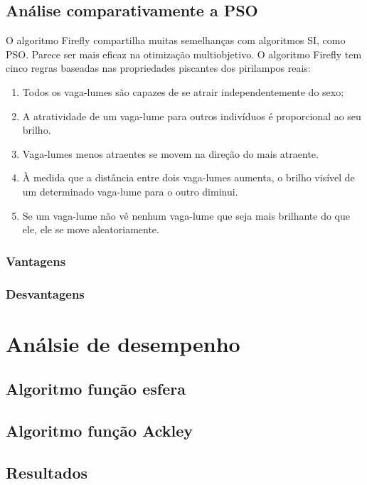 \documentclass[10pt]{article}
\begin{document}
 \subsection{Análise comparativamente a PSO}
O algoritmo Firefly compartilha muitas semelhanças com 
algoritmos SI, como PSO.
Parece ser mais eficaz na otimização multiobjetivo. 
O algoritmo Firefly tem cinco regras baseadas nas propriedades 
piscantes dos pirilampos reais:
\begin{enumerate}
  \item Todos os vaga-lumes são capazes de se atrair independentemente do sexo; 
  \item A atratividade de um vaga-lume para outros indivíduos é proporcional ao seu brilho. 
  \item Vaga-lumes menos atraentes se movem na direção do mais atraente. 
  \item À medida que a distância entre dois vaga-lumes aumenta, o brilho visível de um determinado vaga-lume para o outro diminui. 
  \item Se um vaga-lume não vê nenhum vaga-lume que seja mais brilhante do que ele, ele se move aleatoriamente. 
\end{enumerate}
\subsubsection{Vantagens }\label{sec:apre-da-org}
\subsubsection{Desvantagens}\label{sec:apre-da-org}

\newpage
\section{Análsie de desempenho}\label{sec:an-do-desem}

\subsection{Algoritmo função esfera }\label{sec:apre-da-org}
\subsection{Algoritmo função Ackley }\label{sec:apre-da-org}

\subsection{Resultados}\label{sec:comp-PSO}
\end{document}
